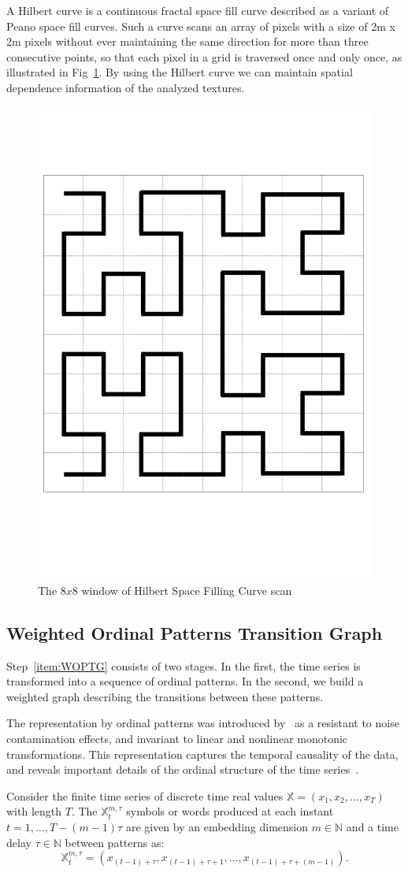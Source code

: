\documentclass{isprs}
\begin{document}
A Hilbert curve is a continuous fractal space fill curve described as a variant of Peano space fill curves.
Such a curve scans an array of pixels with a size of 2m x 2m pixels without ever maintaining the same direction for more than three consecutive points, so that each pixel in a grid is traversed once and only once, as illustrated in Fig~\ref{fig:Hilbert}.
By using the Hilbert curve we can maintain spatial dependence information of the analyzed textures.

\begin{figure}[hbt]
	\centering
	\includegraphics[width=.3\linewidth]{Figures/hilbert.png}
	\caption{The $8 x 8$ window of Hilbert Space Filling Curve scan}
	\label{fig:Hilbert}
\end{figure}

\subsection{Weighted Ordinal Patterns Transition Graph}\label{WATG}

Step~\ref{item:WOPTG} consists of two stages.
In the first, the time series is transformed into a sequence of ordinal patterns.
In the second, we build a weighted graph describing the transitions between these patterns.

The representation by ordinal patterns was introduced by~\cite{Bandt2002Permutation} as a resistant to noise contamination effects, and invariant to linear and nonlinear monotonic transformations.
This representation captures the temporal causality of the data, and reveals important details of the ordinal structure of the time series~\citep{Larrondo2006Random}.

Consider the finite time series of discrete time real values $\mathbb{X} = (x_1, x_2, \dots, x_T)$ with length $T$.
The $\mathbb{X}_t^{m, \tau} $ symbols or words produced at each instant $t = 1, \dots, T- (m-1) \tau$ are given by an embedding dimension $m \in \mathbb{N}$ and a time delay $\tau \in \mathbb{N}$ between patterns as:
\begin{equation}
\mathbb{X}_t^{m,\tau} = (x_{(t-1)+\tau}, x_{(t-1)+\tau+1},\ldots, x_{(t-1)+\tau+(m-1)}).
\end{equation}
\end{document}
